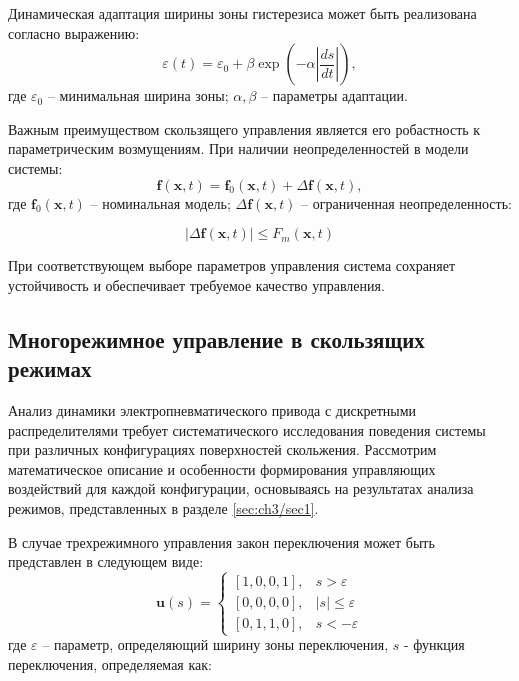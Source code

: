 Динамическая адаптация ширины зоны гистерезиса может быть реализована согласно выражению:
\begin{equation*}
\varepsilon(t) = \varepsilon_0 + \beta\exp\left(-\alpha\left|\frac{ds}{dt}\right|\right),
\end{equation*}
где $\varepsilon_0$ -- минимальная ширина зоны; $\alpha, \beta$ -- параметры адаптации.

Важным преимуществом скользящего управления является его робастность к
параметрическим возмущениям. При наличии неопределенностей в модели системы:
\begin{equation*}
\mathbf{f}(\mathbf{x}, t) = \mathbf{f}_0(\mathbf{x}, t) + \Delta\mathbf{f}(\mathbf{x}, t),
\end{equation*}
где $\mathbf{f}_0(\mathbf{x}, t)$ -- номинальная модель;
$\Delta\mathbf{f}(\mathbf{x}, t)$ -- ограниченная неопределенность:

\begin{equation*}
|\Delta\mathbf{f}(\mathbf{x}, t)| \leq F_m(\mathbf{x}, t)
\end{equation*}

При соответствующем выборе параметров управления система сохраняет устойчивость и обеспечивает требуемое качество управления.

\subsection{Многорежимное управление в скользящих режимах}\label{subsec:ch3/sec3/sub2}

Анализ динамики электропневматического привода с дискретными распределителями требует
систематического исследования поведения системы при различных конфигурациях поверхностей
скольжения. Рассмотрим математическое описание и особенности формирования управляющих
воздействий для каждой конфигурации, основываясь на результатах анализа режимов, представленных в разделе \ref{sec:ch3/sec1}.

В случае трехрежимного управления закон переключения может быть представлен в следующем виде:
\begin{equation}
\mathbf{u}(s) = \begin{cases}
[1,0,0,1], & s > \varepsilon \\
[0,0,0,0], & |s| \leq \varepsilon \\
[0,1,1,0], & s < -\varepsilon
\end{cases}
\end{equation}
где $\varepsilon$ -- параметр, определяющий ширину зоны переключения, $s$ - функция переключения, определяемая как:

